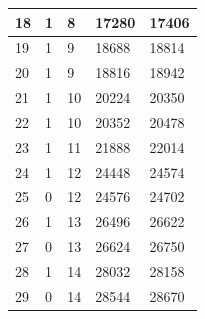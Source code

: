 \documentclass{beamer}
\begin{document}
\begin{frame}
\begin{table}[H]
\begin{center}
\begin{tabular}{| p{1.25cm} | p{1.75cm} | p{2cm} | p{1.75cm} | p{1.75cm} |}
                    \hline
                    18 & 1 & 8 & 17280 & 17406 \\ 
                    \hline
                    19 & 1 & 9 & 18688 & 18814 \\ 
                    \hline
                    20 & 1 & 9 & 18816 & 18942 \\ 
                    \hline
                    21 & 1 & 10 & 20224 & 20350 \\ 
                    \hline
                    22 & 1 & 10 & 20352 & 20478 \\ 
                    \hline
                    23 & 1 & 11 & 21888 & 22014 \\ 
                    \hline
                    24 & 1 & 12 & 24448 & 24574 \\ 
                    \hline
                    25 & 0 & 12 & 24576 & 24702 \\ 
                    \hline
                    26 & 1 & 13 & 26496 & 26622 \\ 
                    \hline
                    27 & 0 & 13 & 26624 & 26750 \\ 
                    \hline
                    28 & 1 & 14 & 28032 & 28158 \\ 
                    \hline
                    29 & 0 & 14 & 28544 & 28670 \\ 
                    \hline
                \end{tabular}
            \end{center}
        \end{table}
\end{frame}
\end{document}
